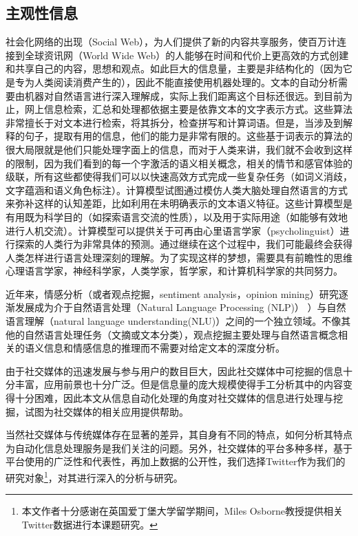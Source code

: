 \subsection{主观性信息}
社会化网络的出现（Social Web），为人们提供了新的内容共享服务，使百万计连接到全球资讯网（World Wide Web）的人能够在时间和代价上更高效的方式创建和共享自己的内容，思想和观点。如此巨大的信息量，主要是非结构化的（因为它是专为人类阅读消费产生的），因此不能直接使用机器处理的。文本的自动分析需要由机器对自然语言进行深入理解成，实际上我们距离这个目标还很远。到目前为止，网上信息检索，汇总和处理都依据主要是依靠文本的文字表示方式。这些算法非常擅长于对文本进行检索，将其拆分，检查拼写和计算词语。但是，当涉及到解释的句子，提取有用的信息，他们的能力是非常有限的。这些基于词表示的算法的很大局限就是他们只能处理字面上的信息，而对于人类来讲，我们就不会收到这样的限制，因为我们看到的每一个字激活的语义相关概念，相关的情节和感官体验的级联，所有这些都使得我们可以以快速高效方式完成一些复杂任务（如词义消歧，文字蕴涵和语义角色标注）。计算模型试图通过模仿人类大脑处理自然语言的方式来弥补这样的认知差距，比如利用在未明确表示的文本语义特征。这些计算模型是有用既为科学目的（如探索语言交流的性质），以及用于实际用途（如能够有效地进行人机交流）。计算模型可以提供关于可再由心里语言学家（psycholinguist）进行探索的人类行为非常具体的预测。通过继续在这个过程中，我们可能最终会获得人类怎样进行语言处理深刻的理解。为了实现这样的梦想，需要具有前瞻性的思维心理语言学家，神经科学家，人类学家，哲学家，和计算机科学家的共同努力。

近年来，情感分析（或者观点挖掘，sentiment analysis，opinion mining）研究逐渐发展成为介于自然语言处理（Natural Language Processing (NLP)） ）与自然语言理解（natural language understanding(NLU)）之间的一个独立领域。不像其他的自然语言处理任务（文摘或文本分类），观点挖掘主要处理与自然语言概念相关的语义信息和情感信息的推理而不需要对给定文本的深度分析。



  
由于社交媒体的迅速发展与参与用户的数目巨大，因此社交媒体中可挖掘的信息十分丰富，应用前景也十分广泛。但是信息量的庞大规模使得手工分析其中的内容变得十分困难，因此本文从信息自动化处理的角度对社交媒体的信息进行处理与挖掘，试图为社交媒体的相关应用提供帮助。

当然社交媒体与传统媒体存在显著的差异，其自身有不同的特点，如何分析其特点为自动化信息处理服务是我们关注的问题。另外，社交媒体的平台多种多样，基于平台使用的广泛性和代表性，再加上数据的公开性，我们选择Twitter作为我们的研究对象\footnote{本文作者十分感谢在英国爱丁堡大学留学期间，Miles Osborne教授提供相关Twitter数据进行本课题研究。}，对其进行深入的分析与研究。

